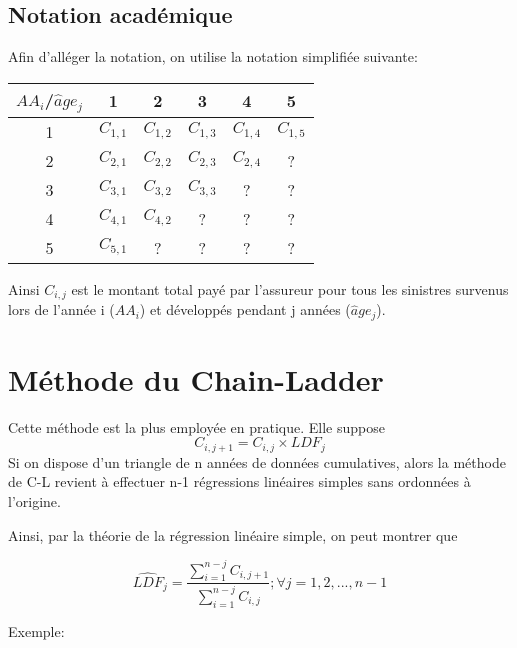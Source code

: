 \subsection*{Notation académique}
Afin d'alléger la notation, on utilise la notation simplifiée suivante:

\begin{center}
\begin{tabular}{|c|c|c|c|c|c|}
  \hline
   $AA_i$/$\widehat{a}ge_j$ & 1 & 2 & 3 & 4 & 5 \\
  \hline
  1 & $C_{1, 1}$ & $C_{1, 2}$ & $C_{1, 3}$ & $C_{1, 4}$ & $C_{1, 5}$\\
  2 & $C_{2, 1}$ & $C_{2, 2}$ & $C_{2, 3}$ & $C_{2, 4}$ & ?\\
  3 & $C_{3, 1}$ & $C_{3, 2}$ & $C_{3, 3}$ & ? & ?\\ 
  4 & $C_{4, 1}$ & $C_{4, 2}$ & ? & ? & ? \\
  5 & $C_{5, 1}$ & ? & ? & ? & ?\\ 
  \hline
\end{tabular}
\end{center}

Ainsi $C_{i,j}$ est le montant total payé par l'assureur pour tous les sinistres survenus lors de l'année i ($AA_i$)  et développés pendant j années ($\widehat{a}ge_j$).

\section{Méthode du Chain-Ladder}
Cette méthode est la plus employée en pratique. Elle suppose
$$ C_{i,j+1} = C_{i,j} \times LDF_j $$
Si on dispose d'un triangle de n années de données cumulatives, alors la méthode de C-L revient à effectuer n-1 régressions linéaires simples sans ordonnées à l'origine.

Ainsi, par la théorie de la régression linéaire simple, on peut montrer que

$$ \widehat{LDF}_j = \frac{\sum_{i=1}^{n-j} C_{i, j + 1}}{\sum_{i=1}^{n-j} C_{i,j}} ; \forall j = 1,2,...,n-1$$

Exemple:

